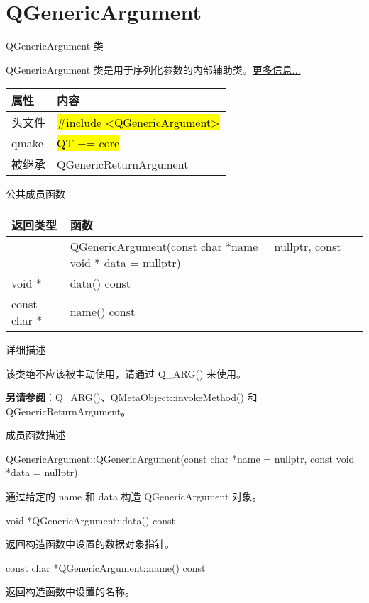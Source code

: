 \chapter{QGenericArgument }

QGenericArgument 类

QGenericArgument 类是用于序列化参数的内部辅助类。\href{https://github.com/JackLovel/QtDocumentCN/blob/master/Src/G/QGenericArgument/QGenericArgument.md#%E8%AF%A6%E7%BB%86%E6%8F%8F%E8%BF%B0}{更多信息...}

\begin{tabular}{|l|l|}
\hline
属性& 	内容\\
\hline
头文件& 	\hl{\#include <QGenericArgument>}\\
\hline
qmake& 	\hl{QT += core}\\
\hline
被继承& 	QGenericReturnArgument\\
\hline
\end{tabular}


\splitLine

公共成员函数


\begin{tabular}{|l|m{30em}|}
\hline
返回类型& 	函数\\
\hline
	&QGenericArgument(const char *name = nullptr, const void * data =
   nullptr)\\
\hline
void * 	&data() const\\
\hline
const char *& 	name() const\\
\hline
\end{tabular}

\splitLine

详细描述

该类绝不应该被主动使用，请通过 Q\_ARG() 来使用。

\textbf{另请参阅}：Q\_ARG()、QMetaObject::invokeMethod() 和 QGenericReturnArgument。

\splitLine

成员函数描述

QGenericArgument::QGenericArgument(const char *name = nullptr, const void *data = nullptr)

通过给定的 name 和 data 构造 QGenericArgument 对象。

void *QGenericArgument::data() const

返回构造函数中设置的数据对象指针。

const char *QGenericArgument::name() const

返回构造函数中设置的名称。

